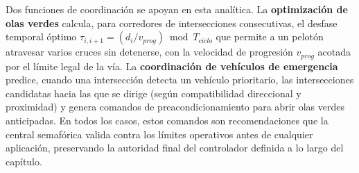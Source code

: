 Dos funciones de coordinación se apoyan en esta analítica. La \textbf{optimización de olas
verdes} calcula, para corredores de intersecciones consecutivas, el desfase temporal óptimo
$\tau_{i,i+1}=(d_i/v_{prog})\bmod T_{ciclo}$ que permite a un pelotón atravesar varios cruces
sin detenerse, con la velocidad de progresión $v_{prog}$ acotada por el límite legal de la vía.
La \textbf{coordinación de vehículos de emergencia} predice, cuando una intersección detecta un
vehículo prioritario, las intersecciones candidatas hacia las que se dirige (según
compatibilidad direccional y proximidad) y genera comandos de preacondicionamiento para abrir
olas verdes anticipadas. En todos los casos, estos comandos son recomendaciones que la central
semafórica valida contra los límites operativos antes de cualquier aplicación, preservando la
autoridad final del controlador definida a lo largo del capítulo.

